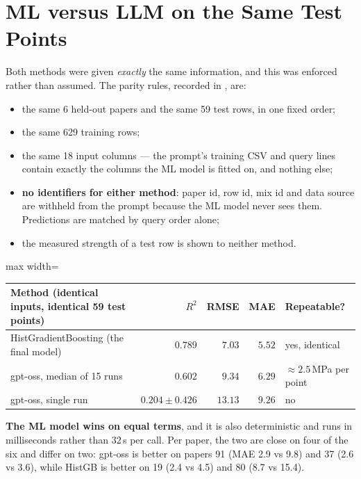 \documentclass[11pt]{article}
\newcommand{\R}{$R^2$}
\begin{document}
\section{ML versus LLM on the Same Test Points}
\label{sec:rcf-p3-vs}
Both methods were given \emph{exactly} the same information, and this was enforced rather
than assumed. The parity rules, recorded in
, are:

\begin{itemize}\itemsep1pt
  \item the same 6 held-out papers and the same 59 test rows, in one fixed order;
  \item the same 629 training rows;
  \item the same 18 input columns --- the prompt's training CSV and query lines contain
        exactly the columns the ML model is fitted on, and nothing else;
  \item \textbf{no identifiers for either method}: paper id, row id, mix id and data
        source are withheld from the prompt because the ML model never sees them.
        Predictions are matched by query order alone;
  \item the measured strength of a test row is shown to neither method.
\end{itemize}

\begin{center}\small
\begin{adjustbox}{max width=\linewidth}
\begin{tabular}{lrrrl}
\toprule
Method (identical inputs, identical 59 test points) & \R{} & RMSE & MAE & Repeatable? \\
\midrule
\rowcolor{green!12}HistGradientBoosting (the final model) & $\mathbf{0.789}$ & $\mathbf{7.03}$ & $\mathbf{5.52}$ & yes, identical \\
gpt-oss, median of 15 runs & $0.602$ & $9.34$ & $6.29$ & $\approx2.5$\,MPa per point \\
gpt-oss, single run & $0.204\pm0.426$ & $13.13$ & $9.26$ & no \\
\bottomrule
\end{tabular}
\end{adjustbox}
\end{center}

\noindent \textbf{The ML model wins on equal terms}, and it is also deterministic and
runs in milliseconds rather than 32\,s per call. Per paper, the two are close on four of
the six and differ on two: gpt-oss is better on papers 91 (MAE 2.9 vs 9.8) and 37 (2.6 vs
3.6), while HistGB is better on 19 (2.4 vs 4.5) and 80 (8.7 vs 15.4).
\end{document}
